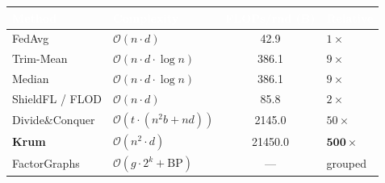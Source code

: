 \documentclass[11pt,a4paper]{article}
\begin{document}
\noindent
\begin{center}
\renewcommand{\arraystretch}{1.3}
\begin{tabular}{
  >{\raggedright\arraybackslash}p{3.5cm}
  >{\centering\arraybackslash}p{3.5cm}
  S[table-format=5.1]
  >{\centering\arraybackslash}p{2.2cm}}
\toprule
{}
\textcolor{white}{\textbf{Method}} &
\textcolor{white}{\textbf{Complexity}} &
\textcolor{white}{\textbf{FLOPs/rnd (B)}} &
\textcolor{white}{\textbf{Relative}} \\
\midrule
FedAvg           & $\mathcal{O}(n \cdot d)$                  & 42.9    & $1\times$ \\
Trim-Mean        & $\mathcal{O}(n \cdot d \cdot \log n)$     & 386.1   & $9\times$ \\
Median           & $\mathcal{O}(n \cdot d \cdot \log n)$     & 386.1   & $9\times$ \\
ShieldFL / FLOD  & $\mathcal{O}(n \cdot d)$                  & 85.8    & $2\times$ \\
Divide\&Conquer  & $\mathcal{O}(t \cdot (n^{2}b + nd))$     & 2145.0  & $50\times$ \\
\textbf{Krum}    & $\mathcal{O}(n^{2}\!\cdot\!d)$            & 21450.0 & $\mathbf{500\times}$ \\
FactorGraphs     & $\mathcal{O}(g \cdot 2^{k} + \text{BP})$  & {---}   & grouped \\
\bottomrule
\end{tabular}
\end{center}
\end{document}
